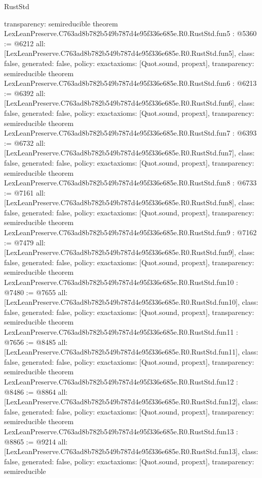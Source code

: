 \begin{lexlean}{RustStd}
\begin{coremodule}
{  transparency: semireducible
}
theorem LexLeanPreserve.C763ad8b782b549b787d4e95f336e685e.R0.RustStd.fun5 : @5360 := @6212 {
  all: [LexLeanPreserve.C763ad8b782b549b787d4e95f336e685e.R0.RustStd.fun5],
  class: false,
  generated: false,
  policy: exact{axioms: [Quot.sound, propext]},
  transparency: semireducible
}
theorem LexLeanPreserve.C763ad8b782b549b787d4e95f336e685e.R0.RustStd.fun6 : @6213 := @6392 {
  all: [LexLeanPreserve.C763ad8b782b549b787d4e95f336e685e.R0.RustStd.fun6],
  class: false,
  generated: false,
  policy: exact{axioms: [Quot.sound, propext]},
  transparency: semireducible
}
theorem LexLeanPreserve.C763ad8b782b549b787d4e95f336e685e.R0.RustStd.fun7 : @6393 := @6732 {
  all: [LexLeanPreserve.C763ad8b782b549b787d4e95f336e685e.R0.RustStd.fun7],
  class: false,
  generated: false,
  policy: exact{axioms: [Quot.sound, propext]},
  transparency: semireducible
}
theorem LexLeanPreserve.C763ad8b782b549b787d4e95f336e685e.R0.RustStd.fun8 : @6733 := @7161 {
  all: [LexLeanPreserve.C763ad8b782b549b787d4e95f336e685e.R0.RustStd.fun8],
  class: false,
  generated: false,
  policy: exact{axioms: [Quot.sound, propext]},
  transparency: semireducible
}
theorem LexLeanPreserve.C763ad8b782b549b787d4e95f336e685e.R0.RustStd.fun9 : @7162 := @7479 {
  all: [LexLeanPreserve.C763ad8b782b549b787d4e95f336e685e.R0.RustStd.fun9],
  class: false,
  generated: false,
  policy: exact{axioms: [Quot.sound, propext]},
  transparency: semireducible
}
theorem LexLeanPreserve.C763ad8b782b549b787d4e95f336e685e.R0.RustStd.fun10 : @7480 := @7655 {
  all: [LexLeanPreserve.C763ad8b782b549b787d4e95f336e685e.R0.RustStd.fun10],
  class: false,
  generated: false,
  policy: exact{axioms: [Quot.sound, propext]},
  transparency: semireducible
}
theorem LexLeanPreserve.C763ad8b782b549b787d4e95f336e685e.R0.RustStd.fun11 : @7656 := @8485 {
  all: [LexLeanPreserve.C763ad8b782b549b787d4e95f336e685e.R0.RustStd.fun11],
  class: false,
  generated: false,
  policy: exact{axioms: [Quot.sound, propext]},
  transparency: semireducible
}
theorem LexLeanPreserve.C763ad8b782b549b787d4e95f336e685e.R0.RustStd.fun12 : @8486 := @8864 {
  all: [LexLeanPreserve.C763ad8b782b549b787d4e95f336e685e.R0.RustStd.fun12],
  class: false,
  generated: false,
  policy: exact{axioms: [Quot.sound, propext]},
  transparency: semireducible
}
theorem LexLeanPreserve.C763ad8b782b549b787d4e95f336e685e.R0.RustStd.fun13 : @8865 := @9214 {
  all: [LexLeanPreserve.C763ad8b782b549b787d4e95f336e685e.R0.RustStd.fun13],
  class: false,
  generated: false,
  policy: exact{axioms: [Quot.sound, propext]},
  transparency: semireducible
}
\end{coremodule}
\end{lexlean}
